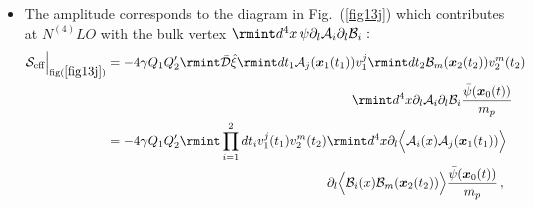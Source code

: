 \begin{itemize}
\begin{align}
\begin{split}
       =\frac{m_1m_2^2s_2^2g_1}{16\pi^2m_p^4}\rmint dt \Big(1+\frac{3}{2}v_1^2\Big)\frac{e^{-2mr}}{r^2}\frac{\Bar{\psi}(\boldsymbol{x}_1(t))}{m_p}+(1\leftrightarrow 2)\,,\\&\sim \mathcal{O}(L^{1/2}v^{9/2})+\mathcal{O}(L^{1/2}v^{13/2}).
    \end{split}
\end{align}
Again note that a part of it is contributing at $N^{(4)}LO$ and the other part is contributing at $N^{(6)}LO.$
\item The amplitude corresponds to the diagram in Fig.~(\ref{fig13j}) which contributes at $N^{(4)}LO$ with the bulk vertex $\rmint d^4x\,\psi \partial_l\mathcal{A}_i\partial_l\mathcal{B}_i :$ 
\vspace{-0.3cm}
\begin{align}
    \begin{split}
   \mathcal{S}_{\text{eff}}\Big |_{\text{fig}(\ref{fig13j})}&=-4\gamma Q_1Q_2'\rmint \Bar{\mathcal{D}}\hat{\xi}\rmint dt_1\mathcal{A}_j(\boldsymbol{x}_1(t_1))v_1^j\rmint dt_2\mathcal{B}_m(\boldsymbol{x}_2(t_2))v_2^m(t_2)\,\\&  \,\,\,\,\,\,\,\,\,\,\,\,\,\,\,\,\,\,\,\,\,\,\,\,\,\,\,\,\,\, \,\,\,\,\,\,\,\,\,\,\,\,\,\,\,\,\,\,\,\,\,\,\,\,\,\,\,\,\,\, \,\,\,\,\,\,\,\,\,\,\,\,\,\,\,\,\,\,\,\,\,\,\,\,\,\,\,\,\,\, \,\,\,\,\,\,\,\,\,\,\,\,\,\,\,\,\,\,\,\,\,\,\,\, \rmint d^4x\partial_l\mathcal{A}_i\partial_l\mathcal{B}_i \frac{ \Bar{\psi}(\boldsymbol{x}_0(t))}{m_p}\\&=-4\gamma Q_1Q_2'\rmint \prod_{i=1}^2dt_iv_1^j(t_1)v_2^m(t_2)\rmint d^4x\partial_l\Big{\langle}\mathcal{A}_i(x)\mathcal{A}_j(\boldsymbol{x}_1(t_1))\Big{\rangle}\\&\hspace{6cm}\partial_l\Big{\langle}\mathcal{B}_i(x)\mathcal{B}_m(\boldsymbol{x}_2(t_2))\Big{\rangle}\frac{\Bar{\psi}(\boldsymbol{x}_0(t))}{m_p}\,,\\ &

\end{split}
\end{align}
\end{itemize}
